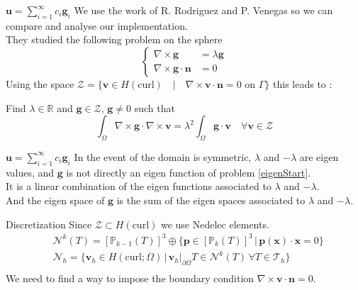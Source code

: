 \documentclass{beamer}
\newcommand{\R}{{\mathbb{R}}}
\newcommand{\Z}{{\bm{\mathcal{Z}}}}
\newcommand{\PP}{{\mathbb{P}}}
\newcommand{\TT}{{\bm{\mathcal{T}}}}
\newcommand{\NN}{{\bm{\mathcal{N}}}}
\newcommand{\curl}{{\nabla\times}}
\newcommand{\restr}{{\big\rvert_{\partial\Omega}}}
\begin{document}
\begin{frame}{$\mathbf{u}=\sum_{i=1}^\infty c_i\mathbf{g}_i$}
  We use the work of R. Rodriguez and P. Venegas \cite{Venegas2013} so we can compare and analyse our implementation.\\
  They studied the following problem on the sphere
  \begin{equation}\label{eigenStart}
    \left\{
    \begin{aligned}
      \curl\mathbf{g}&=\lambda\mathbf{g}\\
      \curl\mathbf{g}\cdot\mathbf{n}&=0
    \end{aligned}
    \right.
  \end{equation}
  Using the space $\Z=\{\mathbf{v}\in H(\mathrm{curl}) \quad|\quad \curl\mathbf{v}\cdot\mathbf{n} = 0 \mbox{ on } \Gamma\}$ this leads to :
  \begin{block}{Find $\lambda\in\R$ and $\mathbf{g}\in \Z$, $\mathbf{g}\neq 0$ such that}
    \begin{equation}\label{eigenwf}
      \int_\Omega \curl\mathbf{g}\cdot\curl\mathbf{v} = \lambda^2\int_\Omega \mathbf{g}\cdot\mathbf{v} \quad \forall\mathbf{v}\in \Z
    \end{equation}
  \end{block}
\end{frame}

\begin{frame}{$\mathbf{u}=\sum_{i=1}^\infty c_i\mathbf{g}_i$}
  In the event of the domain is symmetric, $\lambda$ and $-\lambda$ are eigen values, and $\mathbf{g}$ is not directly an eigen function of problem \ref{eigenStart}.\\
  It is a linear combination of the eigen functions associated to $\lambda$ and $-\lambda$.\\
  And the eigen space of $\mathbf{g}$ is the sum of the eigen spaces associated to $\lambda$ and $-\lambda$.
  \begin{block}{Discretization}
    Since $\Z\subset H(\mathrm{curl})$ we use Nedelec elements.\\
    \begin{align*}
      &\NN^k(T)=[\PP_{k-1}(T)]^3\oplus\{\mathbf{p}\in[\PP_k(T)]^3 \,|\,
      \mathbf{p(x)}\cdot\mathbf{x}=0 \}\\
      &\NN_h=\{\mathbf{v}_h\in H(\mathrm{curl};\Omega) \,|\,
      \mathbf{v}_h\restr{T}\in\NN^k(T)\, \forall T\in \TT_h \}\\
    \end{align*}
    We need to find a way to impose the boundary condition $\curl\mathbf{v}\cdot\mathbf{n}=0$.
  \end{block}
\end{frame}
\end{document}
